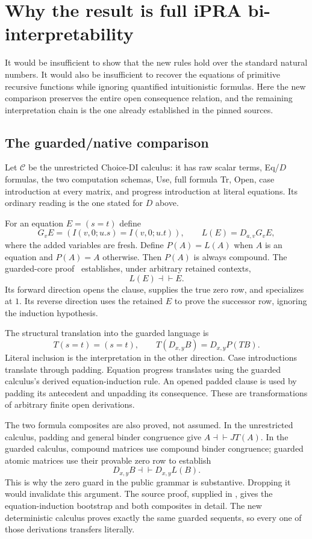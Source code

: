 \section{Why the result is full iPRA bi-interpretability}
\label{sec:bridge}

It would be insufficient to show that the new rules hold over the standard
natural numbers. It would also be insufficient to recover the equations of
primitive recursive functions while ignoring quantified intuitionistic
formulas. Here the new comparison preserves the entire open consequence
relation, and the remaining interpretation chain is the one already
established in the pinned sources.

\subsection{The guarded/native comparison}

Let $\mathcal C$ be the unrestricted Choice-DI calculus: it has raw scalar
terms, Eq/$D$ formulas, the two computation schemas, Use, full formula Tr,
Open, case introduction at every matrix, and progress introduction at literal
equations. Its ordinary reading is the one stated for $D$ above.

For an equation $E=(s=t)$ define
\[
 G_vE=(I(v,0;u.s)=I(v,0;u.t)),\qquad
 L(E)=D_{a,v}G_vE,
\]
where the added variables are fresh. Define $P(A)=L(A)$ when $A$ is an
equation and $P(A)=A$ otherwise. Then $P(A)$ is always compound. The
guarded-core proof~\cite{guarded} establishes, under arbitrary retained
contexts,
\[
 L(E)\dashv\vdash E.
\]
Its forward direction opens the clause, supplies the true zero row, and
specializes at $1$. Its reverse direction uses the retained $E$ to prove the
successor row, ignoring the induction hypothesis.

The structural translation into the guarded language is
\[
 T(s=t)=(s=t),\qquad
 T(D_{x,y}B)=D_{x,y}P(TB).
\]
Literal inclusion is the interpretation in the other direction. Case
introductions translate through padding. Equation progress translates using
the guarded calculus's derived equation-induction rule. An opened padded
clause is used by padding its antecedent and unpadding its consequence.
These are transformations of arbitrary finite open derivations.

The two formula composites are also proved, not assumed. In the unrestricted
calculus, padding and general binder congruence give $A\dashv\vdash JT(A)$.
In the guarded calculus, compound matrices use compound binder congruence;
guarded atomic matrices use their provable zero row to establish
\[
 D_{x,y}B\dashv\vdash D_{x,y}L(B).
\]
This is why the zero guard in the public grammar is substantive. Dropping it
would invalidate this argument. The source proof, supplied in
, gives the equation-induction bootstrap and
both composites in detail. The new deterministic calculus proves exactly the
same guarded sequents, so every one of those derivations transfers literally.

